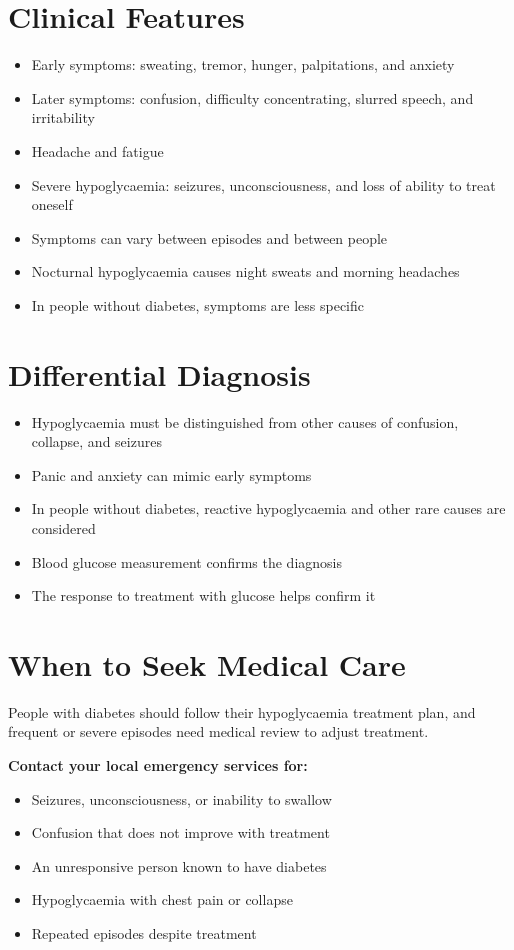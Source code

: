 \section*{Clinical Features}
\begin{itemize}
    \item Early symptoms: sweating, tremor, hunger, palpitations, and anxiety
    \item Later symptoms: confusion, difficulty concentrating, slurred speech, and irritability
    \item Headache and fatigue
    \item Severe hypoglycaemia: seizures, unconsciousness, and loss of ability to treat oneself
    \item Symptoms can vary between episodes and between people
    \item Nocturnal hypoglycaemia causes night sweats and morning headaches
    \item In people without diabetes, symptoms are less specific
\end{itemize}

\section*{Differential Diagnosis}
\begin{itemize}
    \item Hypoglycaemia must be distinguished from other causes of confusion, collapse, and seizures
    \item Panic and anxiety can mimic early symptoms
    \item In people without diabetes, reactive hypoglycaemia and other rare causes are considered
    \item Blood glucose measurement confirms the diagnosis
    \item The response to treatment with glucose helps confirm it
\end{itemize}

\section*{When to Seek Medical Care}
People with diabetes should follow their hypoglycaemia treatment plan, and frequent or severe episodes need medical review to adjust treatment.

\textbf{Contact your local emergency services for:}
\begin{itemize}
    \item Seizures, unconsciousness, or inability to swallow
    \item Confusion that does not improve with treatment
    \item An unresponsive person known to have diabetes
    \item Hypoglycaemia with chest pain or collapse
    \item Repeated episodes despite treatment
\end{itemize}

